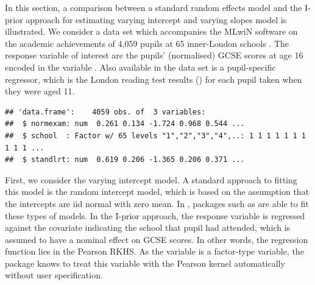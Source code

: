 %
%



In this section, a comparison between a standard random effects model and the I-prior approach for estimating varying intercept and varying slopes model is illustrated. We consider a data set which accompanies the MLwiN software on the academic achievements of 4,059 pupils at 65 inner-London schools \citep{rasbash2012user, R2MLwiN}. The response variable of interest are the pupils' (normalised) GCSE scores at age 16 encoded in the variable . Also available in the data set is a pupil-specific regressor, which is the London reading test results () for each pupil taken when they were aged 11.

\begin{knitrout}
\color{fgcolor}\begin{kframe}
\begin{alltt}
  \hlstd{=} \hlstd{)}
\hlstd{(tutorial[,} \hlstd{(}\hlstd{,} \hlstd{,} \hlstd{)])}
\end{alltt}
\begin{verbatim}
## 'data.frame':	4059 obs. of  3 variables:
##  $ normexam: num  0.261 0.134 -1.724 0.968 0.544 ...
##  $ school  : Factor w/ 65 levels "1","2","3","4",..: 1 1 1 1 1 1 1 1 1 1 ...
##  $ standlrt: num  0.619 0.206 -1.365 0.206 0.371 ...
\end{verbatim}
\end{kframe}
\end{knitrout}



First, we consider the varying intercept model. A standard approach to fitting this model is the random intercept model, which is based on the assumption that the intercepts are iid normal with zero mean. In , packages such as  are able to fit these types of models. In the I-prior approach, the response variable  is regressed against the covariate  indicating the school that pupil had attended, which is assumed to have a nominal effect on GCSE scores. In other words, the regression function lies in the Pearson RKHS. As the variable  is a factor-type variable, the  package knows to treat this variable with the Pearson kernel automatically without user specification.

